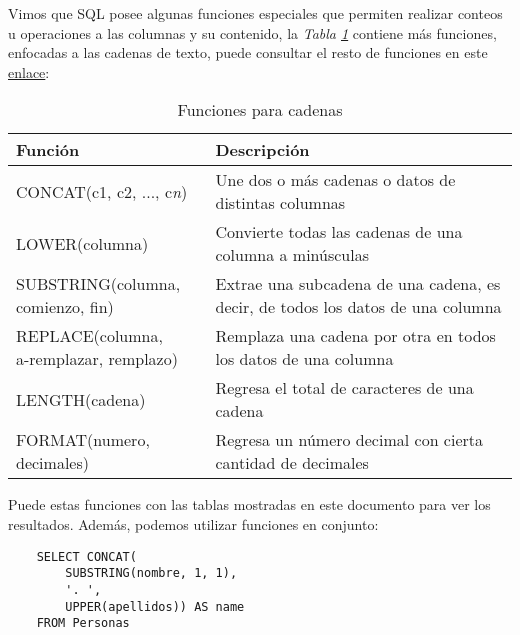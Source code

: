 Vimos que SQL posee algunas funciones especiales que permiten realizar conteos u operaciones a las columnas y su contenido, la \textit{Tabla \ref{tab: 27}} contiene más funciones, enfocadas a las cadenas de texto, puede consultar el resto de funciones en este \href{https://www.tutorialspoint.com/sql/sql-string-functions.htm}{enlace}:
\begin{table}[H]
    \centering
    \caption{Funciones para cadenas}
    \label{tab: 27}
    \begin{tabular}{m{6cm} m{8cm}}
        \hline
        \textbf{Función} & \textbf{Descripción} \\
        \hline
        CONCAT(c1, c2, ..., c\textit{n})        & Une dos o más cadenas o datos de distintas columnas \\
        LOWER(columna)                          & Convierte todas las cadenas de una columna a minúsculas \\
        \parbox{5cm}{SUBSTRING(columna,\\comienzo, fin)}       & Extrae una subcadena de una cadena, es decir, de todos los datos de una columna \\
        \parbox{5cm}{REPLACE(columna,\\a-remplazar, remplazo)} & Remplaza una cadena por otra en todos los datos de una columna \\
        LENGTH(cadena)                          & Regresa el total de caracteres de una cadena \\
        FORMAT(numero, decimales)               & Regresa un número decimal con cierta cantidad de decimales \\
        \hline
    \end{tabular}
\end{table}

Puede estas funciones con las tablas mostradas en este documento para ver los resultados. Además, podemos utilizar funciones en conjunto:
\begin{lstlisting}
    SELECT CONCAT(
        SUBSTRING(nombre, 1, 1),
        '. ',
        UPPER(apellidos)) AS name
    FROM Personas
\end{lstlisting}

